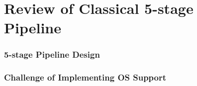 \section{Review of Classical 5-stage Pipeline}


\begin{frame}
    \frametitle{5-stage Pipeline Design}


\end{frame}

\begin{frame}
    \frametitle{Challenge of Implementing OS Support}

\end{frame}
